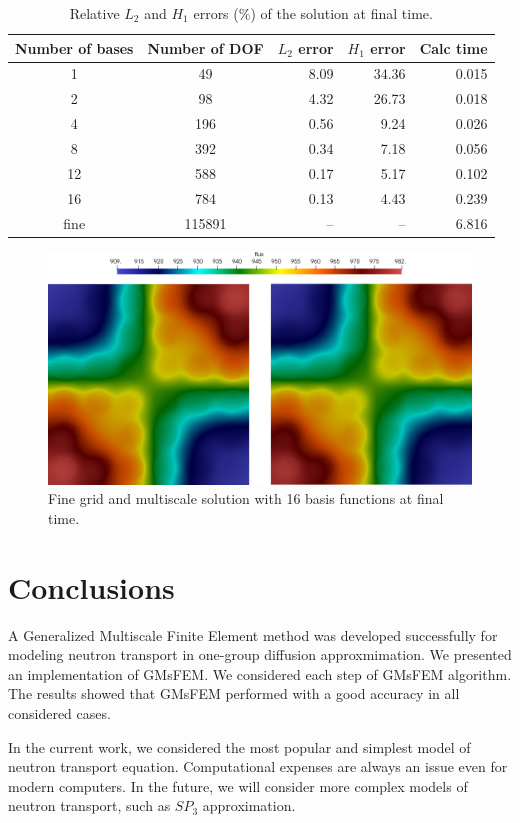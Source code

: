 \documentclass[runningheads]{llncs}
\begin{document}
\begin{table}[h!]
\caption{Relative $L_2$ and $H_1$ errors ($\%$) of the solution at final time.}
\label{t2}
\begin{center}
\begin{tabular}{|c|c|r|r|r|}
\hline
Number of bases & Number of DOF & $L_2$ error & $H_1$ error & Calc time\\
\hline
1 & 49 & 8.09 & 34.36 & 0.015 \\
2 & 98 & 4.32 & 26.73 & 0.018 \\
4 & 196 & 0.56 & 9.24 & 0.026 \\
8 & 392 & 0.34 & 7.18 & 0.056 \\
12 & 588 & 0.17 & 5.17 & 0.102 \\
16 & 784 & 0.13 & 4.43 & 0.239 \\
fine & 115891 & -- & -- & 6.816 \\
\hline
\end{tabular}
\end{center}
\end{table}

\begin{figure}[h!]
\centering
\includegraphics[width=0.75\linewidth]{flux.png} 
\caption{Fine grid and multiscale solution with 16 basis functions at final time.}
\label{p6}
\end{figure} 

\section{Conclusions}
A Generalized Multiscale Finite Element method was developed successfully for modeling neutron transport in one-group diffusion approxmimation.  
We presented an implementation of GMsFEM. 
We considered each step of GMsFEM algorithm.
The results showed that GMsFEM performed with a good accuracy in all considered cases.

In the current work, we considered the most popular and simplest model of neutron transport equation.
Computational expenses are always an issue even for modern computers.
In the future, we will consider more complex models of neutron transport, such as $SP_3$ approximation. 
\end{document}
